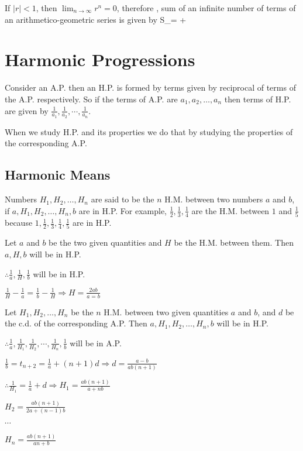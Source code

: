 If $|r|< 1$, then $\displaystyle\lim_{n\to \infty}r^n = 0$, therefore , sum of an infinite number of terms of an arithmetico-geometric series is
given by
\startformula S_\infty =  + \stopformula

\section{Harmonic Progressions}
Consider an A.P. then an H.P. is formed by terms given by reciprocal of terms of the A.P. respectively. So if the terms of A.P. are
$a_1, a_2, \ldots, a_n$ then terms of H.P. are given by $\frac{1}{a_1}, \frac{1}{a_2}, \cdots, \frac{1}{a_n}$.

When we study H.P. and its properties we do that by studying the properties of the corresponding A.P.

\subsection{Harmonic Means}
Numbers $H_1, H_2, \ldots, H_n$ are said to be the $n$ H.M. between two numbers $a$ and $b$, if $a, H_1, H_2, \ldots, H_n, b$ are
in H.P. For example, $\frac{1}{2}, \frac{1}{3}, \frac{1}{4}$ are the H.M. between $1$ and $\frac{1}{5}$ because $1, \frac{1}{2},
\frac{1}{3}, \frac{1}{4}, \frac{1}{5}$ are in H.P.

Let $a$ and $b$ be the two given quantities and $H$ be the H.M. between them. Then $a, H, b$ will be in H.P.

$\therefore \frac{1}{a}, \frac{1}{H}, \frac{1}{b}$ will be in H.P.

$\frac{1}{H} - \frac{1}{a} = \frac{1}{b} - \frac{1}{H} \Rightarrow H = \frac{2ab}{a =b}$

Let $H_1, H_2, \ldots, H_n$ be the $n$ H.M. between two given quantities $a$ and $b$, and $d$ be the c.d. of the corresponding A.P.
Then $a, H_1, H_2, \ldots, H_n, b$ will be in H.P.

$\therefore \frac{1}{a}, \frac{1}{H_1}, \frac{1}{H_2}, \cdots, \frac{1}{H_n}, \frac{1}{b}$ will be in A.P.

$\frac{1}{b} = t_{n + 2} = \frac{1}{a} + (n + 1)d \Rightarrow d = \frac{a - b}{ab(n + 1)}$

$\therefore \frac{1}{H_1} = \frac{1}{a} + d \Rightarrow H_1 = \frac{ab(n + 1)}{a + nb}$

$H_2 = \frac{ab(n + 1)}{2a + (n - 1)b}$

$\cdots$

$H_n = \frac{ab(n + 1)}{an + b}$

